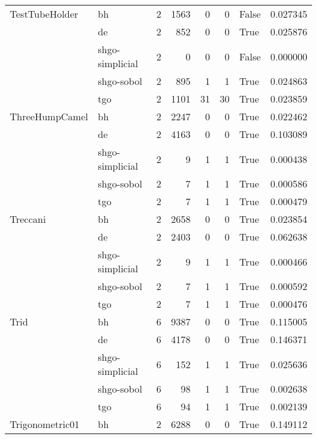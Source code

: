 \begin{longtable}{llrrrrlr}
TestTubeHolder & bh &     2 &     1563 &      0 &       0 &   False &    0.027345 \\
         & de &     2 &      852 &      0 &       0 &    True &    0.025876 \\
         & shgo-simplicial &     2 &        0 &      0 &       0 &   False &    0.000000 \\
         & shgo-sobol &     2 &      895 &      1 &       1 &    True &    0.024863 \\
         & tgo &     2 &     1101 &     31 &      30 &    True &    0.023859 \\
ThreeHumpCamel & bh &     2 &     2247 &      0 &       0 &    True &    0.022462 \\
         & de &     2 &     4163 &      0 &       0 &    True &    0.103089 \\
         & shgo-simplicial &     2 &        9 &      1 &       1 &    True &    0.000438 \\
         & shgo-sobol &     2 &        7 &      1 &       1 &    True &    0.000586 \\
         & tgo &     2 &        7 &      1 &       1 &    True &    0.000479 \\
Treccani & bh &     2 &     2658 &      0 &       0 &    True &    0.023854 \\
         & de &     2 &     2403 &      0 &       0 &    True &    0.062638 \\
         & shgo-simplicial &     2 &        9 &      1 &       1 &    True &    0.000466 \\
         & shgo-sobol &     2 &        7 &      1 &       1 &    True &    0.000592 \\
         & tgo &     2 &        7 &      1 &       1 &    True &    0.000476 \\
Trid & bh &     6 &     9387 &      0 &       0 &    True &    0.115005 \\
         & de &     6 &     4178 &      0 &       0 &    True &    0.146371 \\
         & shgo-simplicial &     6 &      152 &      1 &       1 &    True &    0.025636 \\
         & shgo-sobol &     6 &       98 &      1 &       1 &    True &    0.002638 \\
         & tgo &     6 &       94 &      1 &       1 &    True &    0.002139 \\
Trigonometric01 & bh &     2 &     6288 &      0 &       0 &    True &    0.149112 \\

\end{longtable}
